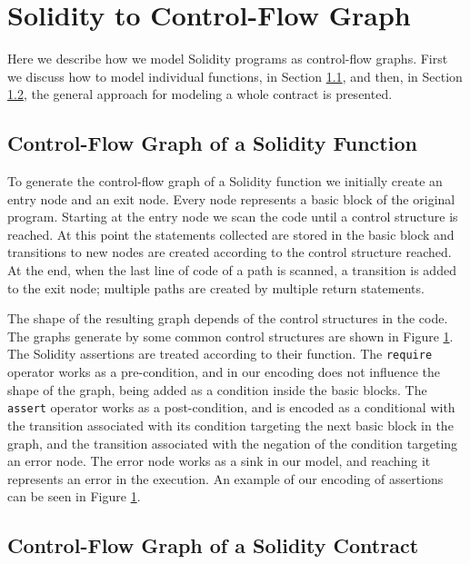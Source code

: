\section{Solidity to Control-Flow Graph}

Here we describe how we model Solidity programs as control-flow graphs. First we discuss how to model individual functions, in Section \ref{sec:sol_cfg_fun}, and then, in Section \ref{sec:sol_cfg_con}, the general approach for modeling a whole contract is presented.


\subsection{Control-Flow Graph of a Solidity Function} \label{sec:sol_cfg_fun}

To generate the control-flow graph of a Solidity function we initially create an entry node and an exit node. Every node represents a basic block of the original program. Starting at the entry node we scan the code until a control structure is reached. At this point the statements collected are stored in the basic block and transitions to new nodes are created according to the control structure reached. At the end, when the last line of code of a path is scanned, a transition is added to the exit node; multiple paths are created by multiple return statements.

The shape of the resulting graph depends of the control structures in the code. The graphs generate by some common control structures are shown in Figure \ref{}. The Solidity assertions are treated according to their function. The \texttt{require} operator works as a pre-condition, and in our encoding does not influence the shape of the graph, being added as a condition inside the basic blocks. The \texttt{assert} operator works as a post-condition, and is encoded as a conditional with the transition associated with its condition targeting the next basic block in the graph, and the transition associated with the negation of the condition targeting an error node. The error node works as a sink in our model, and reaching it represents an error in the execution. An example of our encoding of assertions can be seen in Figure \ref{}.


\subsection{Control-Flow Graph of a Solidity Contract} \label{sec:sol_cfg_con}

